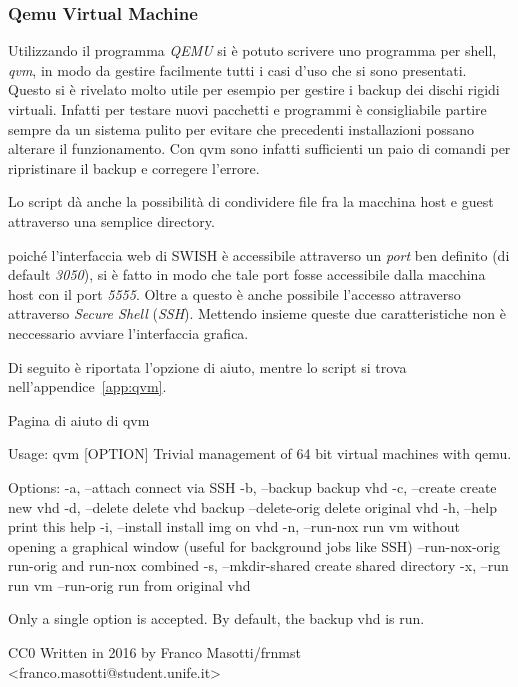 \documentclass[10pt,titlepage,twoside,a4paper]{report}
\newenvironment{code}{\singlespacing\captionsetup{type=listing}}{}
\begin{document}
\subsubsection{Qemu Virtual Machine}
Utilizzando il programma \emph{QEMU}\cite{qemu} si è potuto scrivere uno 
programma per 
shell, \emph{qvm}, in modo da gestire facilmente tutti i casi d'uso che si 
sono presentati\cite{qvm}. Questo si è rivelato molto utile per esempio per 
gestire i backup dei dischi rigidi virtuali. Infatti per testare nuovi 
pacchetti e programmi è consigliabile partire sempre da un sistema pulito
per evitare che precedenti installazioni possano alterare il funzionamento.
Con qvm sono infatti sufficienti un paio di comandi per ripristinare il 
backup e corregere l'errore.

Lo script dà anche la possibilità di condividere file fra la macchina host 
e guest attraverso una semplice directory.

poiché l'interfaccia web di SWISH è accessibile attraverso un \emph{port} 
ben definito (di default \emph{3050}), si è fatto in modo che tale port 
fosse accessibile dalla macchina host con il port \emph{5555}. Oltre a questo 
è anche possibile l'accesso attraverso attraverso \emph{Secure 
Shell} (\emph{SSH}). Mettendo insieme queste due caratteristiche non è 
neccessario avviare l'interfaccia grafica.

Di seguito è riportata l'opzione di aiuto, mentre lo script si trova 
nell'appendice~\ref{app:qvm}.

\begin{code}
    \caption{Pagina di aiuto di qvm}
    \begin{textcode*}{}
Usage: qvm [OPTION]
Trivial management of 64 bit virtual machines with qemu.

Options:
    -a, --attach                connect via SSH
    -b, --backup                backup vhd
    -c, --create                create new vhd
    -d, --delete                delete vhd backup
        --delete-orig           delete original vhd
    -h, --help                  print this help
    -i, --install               install img on vhd
    -n, --run-nox               run vm without opening a graphical window
                                (useful for background jobs like SSH)
        --run-nox-orig          run-orig and run-nox combined
    -s, --mkdir-shared          create shared directory
    -x, --run                   run vm
        --run-orig              run from original vhd


Only a single option is accepted.
By default, the backup vhd is run.

CC0
Written in 2016 by Franco Masotti/frnmst <franco.masotti@student.unife.it>
    \end{textcode*}
\end{code}
\end{document}
